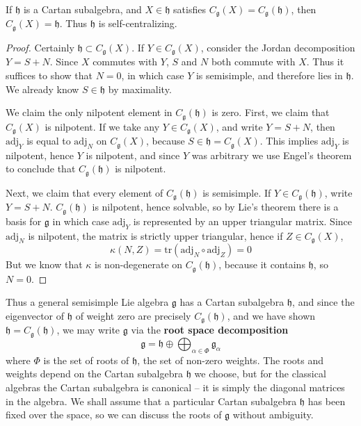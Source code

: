 \begin{theorem}
    If $\mathfrak{h}$ is a Cartan subalgebra, and $X \in \mathfrak{h}$ satisfies $C_\mathfrak{g}(X) = C_\mathfrak{g}(\mathfrak{h})$, then $C_\mathfrak{g}(X) = \mathfrak{h}$. Thus $\mathfrak{h}$ is self-centralizing.
\end{theorem}
\begin{proof}
    Certainly $\mathfrak{h} \subset C_\mathfrak{g}(X)$. If $Y \in C_\mathfrak{g}(X)$, consider the Jordan decomposition $Y = S + N$. Since $X$ commutes with $Y$, $S$ and $N$ both commute with $X$. Thus it suffices to show that $N = 0$, in which case $Y$ is semisimple, and therefore lies in $\mathfrak{h}$. We already know $S \in \mathfrak{h}$ by maximality.

    We claim the only nilpotent element in $C_\mathfrak{g}(\mathfrak{h})$ is zero. First, we claim that $C_\mathfrak{g}(X)$ is nilpotent. If we take any $Y \in C_\mathfrak{g}(X)$, and write $Y = S + N$, then $\text{adj}_Y$ is equal to $\text{adj}_N$ on $C_\mathfrak{g}(X)$, because $S \in \mathfrak{h} = C_\mathfrak{g}(X)$. This implies $\text{adj}_Y$ is nilpotent, hence $Y$ is nilpotent, and since $Y$ was arbitrary we use Engel's theorem to conclude that $C_\mathfrak{g}(\mathfrak{h})$ is nilpotent.

    Next, we claim that every element of $C_\mathfrak{g}(\mathfrak{h})$ is semisimple. If $Y \in C_\mathfrak{g}(\mathfrak{h})$, write $Y = S + N$. $C_\mathfrak{g}(\mathfrak{h})$ is nilpotent, hence solvable, so by Lie's theorem there is a basis for $\mathfrak{g}$ in which case $\text{adj}_Y$ is represented by an upper triangular matrix. Since $\text{adj}_N$ is nilpotent, the matrix is strictly upper triangular, hence if $Z \in C_\mathfrak{g}(X)$,
    \[ \kappa(N,Z) = \text{tr}(\text{adj}_N \circ \text{adj}_Z) = 0 \]
    But we know that $\kappa$ is non-degenerate on $C_\mathfrak{g}(\mathfrak{h})$, because it contains $\mathfrak{h}$, so $N = 0$.
\end{proof}

Thus a general semisimple Lie algebra $\mathfrak{g}$ has a Cartan subalgebra $\mathfrak{h}$, and since the eigenvector of $\mathfrak{h}$ of weight zero are precisely $C_\mathfrak{g}(\mathfrak{h})$, and we have shown $\mathfrak{h} = C_\mathfrak{g}(\mathfrak{h})$, we may write $\mathfrak{g}$ via the {\bf root space decomposition}
%
\[ \mathfrak{g} = \mathfrak{h} \oplus \bigoplus_{\alpha \in \Phi} \mathfrak{g}_\alpha \]
%
where $\Phi$ is the set of roots of $\mathfrak{h}$, the set of non-zero weights. The roots and weights depend on the Cartan subalgebra $\mathfrak{h}$ we choose, but for the classical algebras the Cartan subalgebra is canonical -- it is simply the diagonal matrices in the algebra. We shall assume that a particular Cartan subalgebra $\mathfrak{h}$ has been fixed over the space, so we can discuss the roots of $\mathfrak{g}$ without ambiguity.

